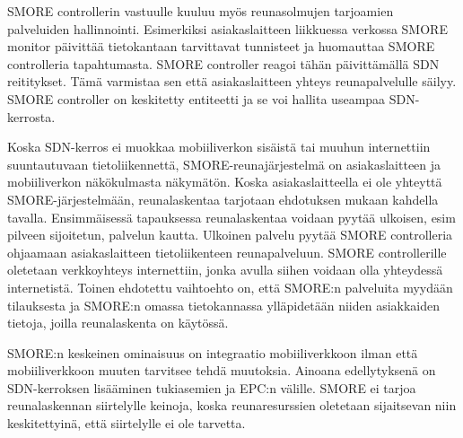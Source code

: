 SMORE controllerin vastuulle kuuluu myös reunasolmujen tarjoamien palveluiden hallinnointi. 
Esimerkiksi asiakaslaitteen liikkuessa verkossa SMORE monitor päivittää tietokantaan tarvittavat tunnisteet ja huomauttaa SMORE controlleria tapahtumasta. SMORE controller reagoi tähän päivittämällä SDN reititykset. Tämä varmistaa sen että asiakaslaitteen yhteys reunapalvelulle säilyy. SMORE controller on keskitetty entiteetti ja se voi hallita useampaa SDN-kerrosta.

Koska SDN-kerros ei muokkaa mobiiliverkon sisäistä tai muuhun  internettiin suuntautuvaan tietoliikennettä, SMORE-reunajärjestelmä on asiakaslaitteen ja mobiiliverkon näkökulmasta näkymätön.
Koska asiakaslaitteella ei ole yhteyttä SMORE-järjestelmään, reunalaskentaa tarjotaan ehdotuksen mukaan kahdella tavalla. Ensimmäisessä tapauksessa reunalaskentaa voidaan pyytää ulkoisen, esim pilveen sijoitetun, palvelun kautta. Ulkoinen palvelu pyytää SMORE controlleria ohjaamaan asiakaslaitteen tietoliikenteen reunapalveluun.
SMORE controllerille oletetaan verkkoyhteys internettiin, jonka avulla siihen voidaan olla yhteydessä internetistä.
Toinen ehdotettu vaihtoehto on, että SMORE:n palveluita myydään tilauksesta ja SMORE:n omassa tietokannassa ylläpidetään niiden asiakkaiden tietoja, joilla reunalaskenta on käytössä. 

SMORE:n keskeinen ominaisuus on integraatio mobiiliverkkoon ilman että mobiiliverkkoon muuten tarvitsee tehdä muutoksia. Ainoana edellytyksenä on SDN-kerroksen lisääminen tukiasemien ja EPC:n välille. SMORE ei tarjoa reunalaskennan siirtelylle keinoja, koska reunaresurssien oletetaan sijaitsevan niin keskitettyinä, että siirtelylle ei ole tarvetta.

